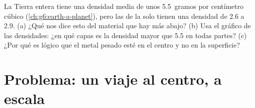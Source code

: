 \begin{exercise}[$\star\star\star$]\label{exo:g6:inside-the-earth:12}
La Tierra entera tiene una densidad media de unos 5.5~gramos por
centímetro cúbico (\cref{ch:g6:earth-a-planet}), pero las  de la
 solo tienen una densidad de 2.6 a 2.9. (a) ¿Qué nos dice esto del
material que hay más abajo? (b) Usa el gráfico de las densidades: ¿en qué capas es la densidad mayor que 5.5 en todas partes? (c) ¿Por qué es lógico que el metal pesado esté en el
centro y no en la superficie?
\end{exercise}

\section{Problema: un viaje al centro, a escala}

